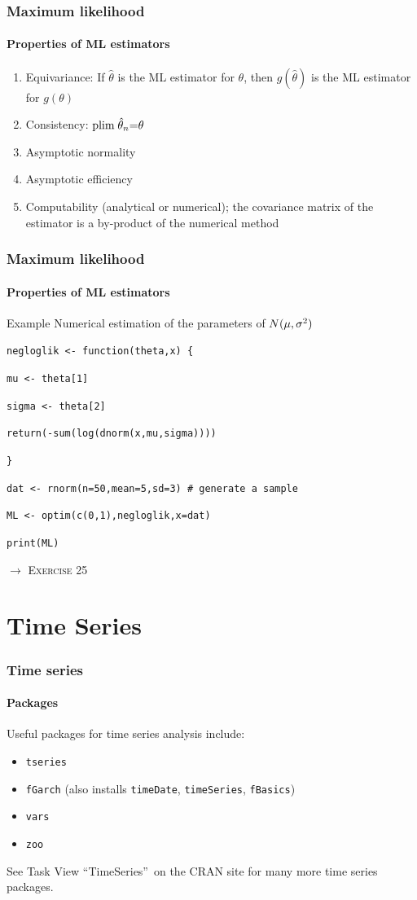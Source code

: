 \documentclass[title={Introduction to R}, author={Mutschler and Zaharieva}, inst={Institute for Econometrics and Empirical Economics}]{beamer}
\begin{document}
\begin{frame}
\frametitle{Maximum likelihood}
\framesubtitle{Properties of ML estimators}
\begin{enumerate}
\item Equivariance: If $\hat{\theta}$ is the ML estimator for $\theta $,
then $g(\hat{\theta})$ is the ML estimator for $g(\theta )$
\item Consistency: $ \text{plim\;} \hat{\theta}_{n}\mathbf{=}\theta $
\item Asymptotic normality
\item Asymptotic efficiency
\item Computability (analytical or numerical); the covariance matrix of the
estimator is a by-product of the numerical method
\end{enumerate}
\end{frame}


\begin{frame}
\frametitle{Maximum likelihood}
\framesubtitle{Properties of ML estimators}
\begin{block}{Example}
Numerical estimation of the parameters of $N(\mu ,\sigma ^{2})\medskip $

\texttt{negloglik <- function(theta,x) \{}

\quad \texttt{mu <- theta[1]}

\quad \texttt{sigma <- theta[2]}

\quad \texttt{return(-sum(log(dnorm(x,mu,sigma))))}

\texttt{\}}

\texttt{dat <- rnorm(n=50,mean=5,sd=3) \# generate a sample}

\texttt{ML <- optim(c(0,1),negloglik,x=dat)}

\texttt{print(ML)}
\end{block}\pause
$\longrightarrow $ \textsc{Exercise 25}
\end{frame}


\section{Time Series}
\begin{frame}	
	\frametitle{Time series}	
	\framesubtitle{Packages}	
	Useful packages for time series analysis include:	
	\begin{itemize}
		\item \texttt{tseries}		
		\item \texttt{fGarch} (also installs \texttt{timeDate}, \texttt{timeSeries}, \texttt{fBasics})
		\item \texttt{vars}		
		\item \texttt{zoo}
	\end{itemize}	
	\medskip See Task View \textquotedblleft TimeSeries\textquotedblright\ on
	the CRAN site for many more\newline
	time series packages.
\end{frame}
\end{document}
